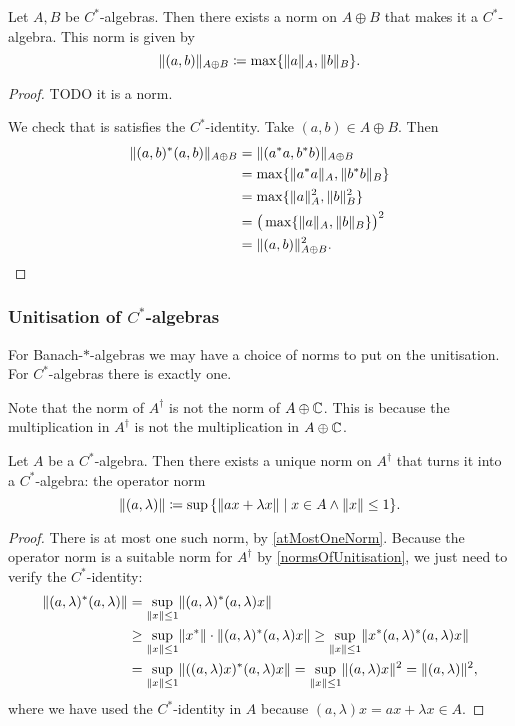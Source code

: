 \begin{proposition}
Let $A,B$ be $C^*$-algebras. Then there exists a norm on $A\oplus B$ that makes it a $C^*$-algebra. This norm is given by
\[ \lVert(a,b)\rVert_{A\oplus B} \coloneqq \max\{\lVert a\rVert_A, \lVert b\rVert_B\}. \]
\end{proposition}
\begin{proof}
TODO it is a norm.

We check that is satisfies the $C^*$-identity. Take $(a,b)\in A\oplus B$. Then
\begin{align*}
\lVert(a,b)^*(a,b)\rVert_{A\oplus B} &= \lVert(a^*a,b^*b)\rVert_{A\oplus B} \\
&= \max\{\lVert a^*a\rVert_A, \lVert b^*b\rVert_B\} \\
&= \max\{\lVert a\rVert_A^2, \lVert b\rVert_B^2\} \\
&= \big(\max\{\lVert a\rVert_A, \lVert b\rVert_B\}\big)^2 \\
&= \lVert(a,b)\rVert_{A\oplus B}^2.
\end{align*}
\end{proof}

\subsubsection{Unitisation of $C^*$-algebras}
For Banach-$*$-algebras we may have a choice of norms to put on the unitisation. For $C^*$-algebras there is exactly one.

Note that the norm of $A^\dagger$ is not the norm of $A\oplus \mathbb{C}$. This is because the multiplication in $A^\dagger$ is not the multiplication in $A\oplus \mathbb{C}$.
\begin{proposition}
Let $A$ be a $C^*$-algebra. Then there exists a unique norm on $A^\dagger$ that turns it into a $C^*$-algebra: the operator norm
\[ \norm{(a,\lambda)} \defeq \sup\setbuilder{\norm{ax + \lambda x}}{x\in A \land \norm{x}\leq 1} .\]
\end{proposition}
\begin{proof}
There is at most one such norm, by \ref{atMostOneNorm}. Because the operator norm is a suitable norm for $A^\dagger$ by \ref{normsOfUnitisation}, we just need to verify the $C^*$-identity:
\begin{align*}
\lVert(a,\lambda)^*(a,\lambda)\rVert &= \sup_{\lVert x\rVert\leq 1} \lVert(a,\lambda)^*(a,\lambda)x\rVert \\
&\geq \sup_{\lVert x\rVert\leq 1} \lVert x^*\rVert\cdot\lVert(a,\lambda)^*(a,\lambda)x\rVert \geq \sup_{\lVert x\rVert\leq 1} \lVert x^*(a,\lambda)^*(a,\lambda)x\rVert \\
&= \sup_{\lVert x\rVert\leq 1} \lVert((a,\lambda)x)^*(a,\lambda)x\rVert = \sup_{\lVert x\rVert\leq 1} \lVert(a,\lambda)x\rVert^2 = \lVert(a,\lambda)\rVert^2,
\end{align*}
where we have used the $C^*$-identity in $A$ because $(a,\lambda)x = ax + \lambda x \in A$.
\end{proof}

